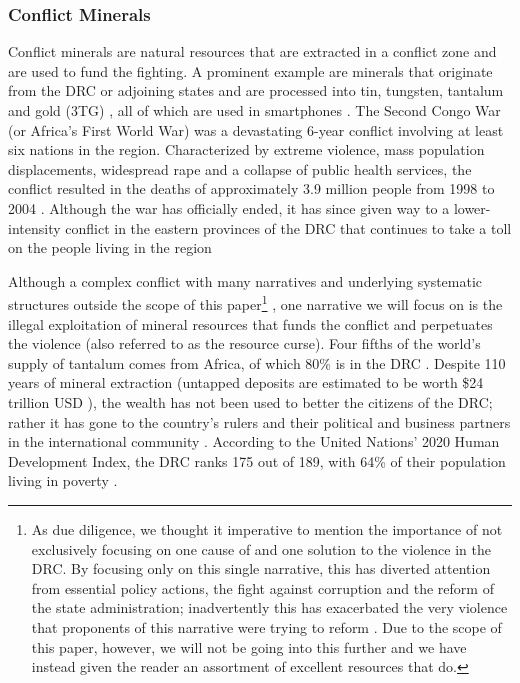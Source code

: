 \documentclass{article}
\begin{document}
\subsubsection{Conflict Minerals} \label{SECTION_CONFLICT_MINERALS}
Conflict minerals are natural resources that are extracted in a conflict zone and are used to fund the fighting. A prominent example are minerals that originate from the DRC or adjoining states and are processed into tin, tungsten, tantalum and gold (3TG) \cite{fitzpatrick2015conflict}, all of which are used in smartphones \cite{compoundinterest2014}. The Second Congo War (or Africa's First World War) was a devastating 6-year conflict involving at least six nations in the region. Characterized by extreme violence, mass population displacements, widespread rape and a collapse of public health services, the conflict resulted in the deaths of approximately 3.9 million people from 1998 to 2004 \cite{coghlan2006mortality}. %
Although the war has officially ended, it has since given way to a lower-intensity conflict in the eastern provinces of the DRC that continues to take a toll on the people living in the region \cite{coghlan2009update, cfr2021congoconflict}

Although a complex conflict with many narratives and underlying systematic structures outside the scope of this paper\footnote{As due diligence, we thought it imperative to mention the importance of not exclusively focusing on one cause of and one solution to the violence in the DRC. By focusing only on this single narrative, this has diverted attention from essential policy actions, the fight against corruption and the reform of the state administration; inadvertently this has exacerbated the very violence that proponents of this narrative were trying to reform \cite{autesserre2012dangerous}. Due to the scope of this paper, however, we will not be going into this further and we have instead given the reader an assortment of excellent resources that do.}
\cite{autesserre2012dangerous, alorse2015assessing, grant2015new}, one narrative we will focus on is the illegal exploitation of mineral resources that funds the conflict and perpetuates the violence (also referred to as the resource curse). Four fifths of the world's supply of tantalum comes from Africa, of which 80\% is in the DRC \cite{nzongola2002congo, montague2002stolen}. Despite 110 years of mineral extraction (untapped deposits are estimated to be worth \$24 trillion USD \cite{cfr2021congoconflict}), the wealth has not been used to better the citizens of the DRC; rather it has gone to the country's rulers and their political and business partners in the international community \cite{nzongola2002congo}. According to the United Nations' 2020 Human Development Index, the DRC ranks 175 out of 189, with 64\% of their population living in poverty \cite{unitednations2020hdr}.
\end{document}
